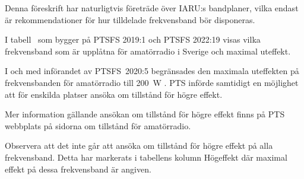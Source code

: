 Denna föreskrift har naturligtvis företräde över IARU:s bandplaner, vilka
endast är rekommendationer för hur tilldelade frekvensband bör disponeras.

I tabell~ som bygger på PTSFS 2019:1 och PTSFS 2022:19
visas vilka frekvensband som är upplåtna för amatörradio i Sverige och maximal
uteffekt.

I och med införandet av PTSFS~2020:5 begränsades den maximala uteffekten på
frekvensbanden för amatörradio till \qty{200}{\watt} \pep.
PTS införde samtidigt en möjlighet att för enskilda platser ansöka om tillstånd
för högre effekt.

Mer information gällande ansökan om tillstånd för högre effekt finns på PTS
webbplats på sidorna om tillstånd för amatörradio.

Observera att det inte går att ansöka om tillstånd för högre effekt på alla
frekvensband.
Detta har markerats i tabellens kolumn Högeffekt där maximal effekt på dessa
frekvensband är angiven.

